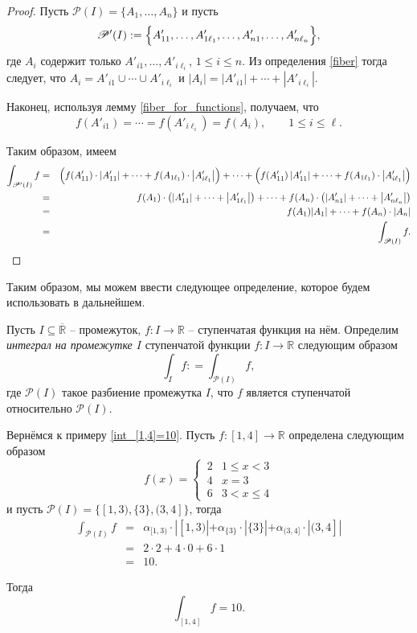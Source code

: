 \begin{proof}
    Пусть $\mathscr{P}(I) = \{ A_1,\ldots, A_n \}$ и пусть 
    \[
     \mathscr{P}'(I) : = \Bigl\{A_{11}', \ldots, A'_{1\ell_1},\ldots, A'_{n1},\ldots, A'_{n\ell_n} \Bigr\},
    \]
    где $A_i$ содержит только $A'_{i1},\ldots, A'_{i\ell_i}$, $1\le i \le n$. Из определения \ref{fiber} тогда следует, что $A_i = A'_{i1} \cup \cdots \cup A'_{i\ell_i}$ и $|A_i| = |A'_{i1}| + \cdots + |A'_{i\ell_i}|$.
    
    Наконец, используя лемму \ref{fiber_for_functions}, получаем, что
    \[
     f(A'_{i1}) = \cdots = f(A'_{i\ell_i}) = f(A_i), \qquad 1 \le i \le \ell.
    \]

    Таким образом, имеем
    \begin{eqnarray*}
        \int_{\mathscr{P}'(I)}f &=& \Bigl(f(A_{11}') \cdot \left| A'_{11} \right| + \cdots + f(A_{1\ell_1})\cdot \left|A'_{i\ell_1}\right|\Bigr) + \cdots + \Bigl(f(A_{11}') \left|A_{11}'\right| + \cdots + f(A_{1\ell_1})\cdot \left|A'_{i\ell_1}\right| \Bigr) \\
        &=& f(A_1) \cdot \left( \left| A'_{11}  \right| + \cdots + \left| A'_{1\ell_1} \right| \right) + \cdots + f(A_n) \cdot \left( \left| A'_{n1}  \right| + \cdots + \left| A'_{n\ell_n} \right| \right) \\
        &=& f(A_1) |A_1| + \cdots + f(A_n)\cdot |A_n| \\
        &=& \int_{\mathscr{P}(I)}f.
    \end{eqnarray*}
\end{proof}


Таким образом, мы можем ввести следующее определение, которое будем использовать в дальнейшем.

\begin{definition}\label{int_of_p.c}
    Пусть $I \subseteq \overline{\mathbb{R}}$ -- промежуток, $f:I \to \mathbb{R}$ -- ступенчатая функция на нём. Определим \textit{интеграл на промежутке $I$} ступенчатой функции $f:I \to \mathbb{R}$ следующим образом
    \[
     \int_If: =  \int_{\mathscr{P}(I)}f,
    \]
    где $\mathscr{P}(I)$ такое разбиение промежутка $I$, что $f$ является ступенчатой относительно $\mathscr{P}(I).$
\end{definition}


\begin{example}
Вернёмся к примеру \ref{int_[1,4]=10}. Пусть $f: [1,4] \to \mathbb{R}$ определена следующим образом
    \[
     f(x)  = \begin{cases}
          \, 2 & 1 \le x <3 \\
          \, 4 & x = 3 \\
          \, 6 & 3< x \le 4
     \end{cases}
    \]
    и пусть $\mathscr{P}(I) = \{ [1,3), \{3\}, (3,4] \}$, тогда
 \begin{eqnarray*}
  \int_{\mathscr{P}(I)} f  &=& \alpha_{[1,3)}\cdot | [1,3) | + \alpha_{\{3\}}\cdot |\{3\}| + \alpha_{(3,4]} \cdot | (3,4] | \\
  &=& 2 \cdot 2 + 4 \cdot 0 + 6 \cdot 1 \\
  &=& 10.
   \end{eqnarray*}

Тогда
\[
 \int_{[1,4]}f   =10.
\]
\end{example}

